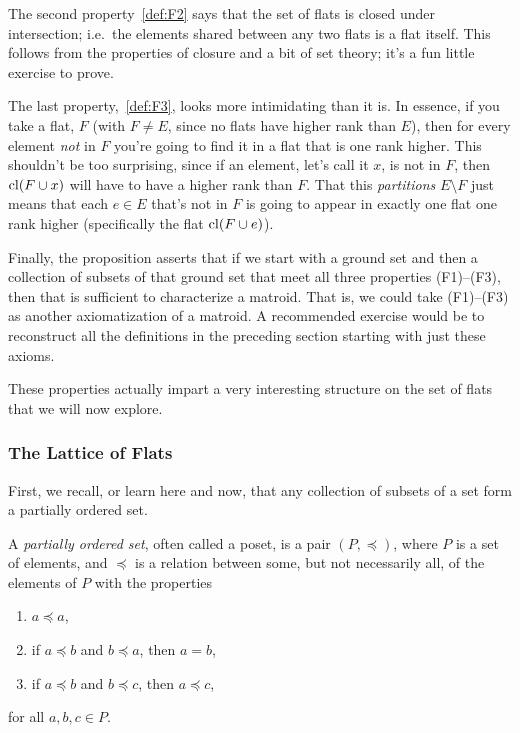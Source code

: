 \documentclass[12pt,oneside]{../../sfsuthesis}
\begin{document}
The second property~\ref{def:F2} says that the set of flats is closed under intersection;
i.e.\ the elements shared between any two flats is a flat itself.
This follows from the properties of closure and a bit of set theory; it's a fun little exercise to prove.

The last property,~\ref{def:F3}, looks more intimidating than it is.
In essence, if you take a flat, \( F \) (with \( F \neq E \), since no flats have higher rank than \( E \)), then for every element \emph{not} in \( F \) you're going to find it in a flat that is one rank higher.
This shouldn't be too surprising, since if an element, let's call it \( x \), is not in \( F \), then \( \operatorname{cl}(F \cup x) \) will have to have a higher rank than \( F \).
That this \emph{partitions} \( E \setminus F \) just means that each \( e \in E \) that's not in \( F \) is going to appear in exactly one flat one rank higher (specifically the flat \( \operatorname{cl}(F \cup e) \)).

Finally, the proposition asserts that if we start with a ground set and then a collection of subsets of that ground set that meet all three properties (F1)--(F3), then that is sufficient to characterize a matroid.
That is, we could take (F1)--(F3) as another axiomatization of a matroid.
A recommended exercise would be to reconstruct all the definitions in the preceding section starting with just these axioms.

These properties actually impart a very interesting structure on the set of flats that we will now explore.

\subsubsection{The Lattice of Flats}

First, we recall, or learn here and now, that any collection of subsets of a set form a partially ordered set.

\begin{definition}\th\label{def:poset}
    A \emph{partially ordered set}, often called a poset, is a pair \( (P, \preceq) \), where \( P \) is a set of elements, and \( \preceq \) is a relation between some, but not necessarily all, of the elements of \( P \) with the properties
    \begin{enumerate}[label=\roman*.]
        \item \( a \preceq a \),
        \item if \( a \preceq b \) and \( b \preceq a \), then \( a = b \),
        \item if \( a \preceq b \) and \( b \preceq c \), then \( a \preceq c \),
    \end{enumerate}
    for all \( a, b, c \in P \).
\end{definition}
\end{document}
